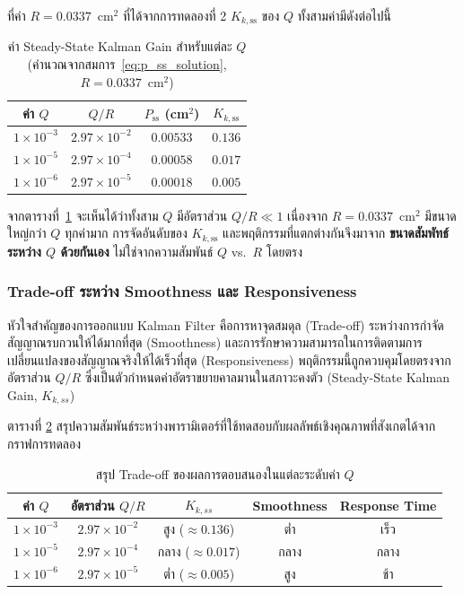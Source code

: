 ที่ค่า $R = 0.0337$~cm$^2$ ที่ได้จากการทดลองที่ 2
$K_{k,\mathrm{ss}}$ ของ $Q$ ทั้งสามค่ามีดังต่อไปนี้

\begin{table}[htbp]
    \centering
    \caption{ค่า Steady-State Kalman Gain สำหรับแต่ละ $Q$
             (คำนวณจากสมการ~\eqref{eq:p_ss_solution}, $R = 0.0337$~cm$^2$)}
    \label{tab:kss_theory}
    \begin{tabular}{cccc}
        \hline
        \textbf{ค่า $Q$} & \textbf{$Q/R$} & \textbf{$P_\mathrm{ss}$ (cm$^2$)} & \textbf{$K_{k,\mathrm{ss}}$} \\
        \hline
        $1\times10^{-3}$ & $2.97\times10^{-2}$ & $0.00533$ & $0.136$ \\
        $1\times10^{-5}$ & $2.97\times10^{-4}$ & $0.00058$ & $0.017$ \\
        $1\times10^{-6}$ & $2.97\times10^{-5}$ & $0.00018$ & $0.005$ \\
        \hline
    \end{tabular}
\end{table}

จากตารางที่~\ref{tab:kss_theory} จะเห็นได้ว่าทั้งสาม $Q$ มีอัตราส่วน $Q/R \ll 1$
เนื่องจาก $R = 0.0337$~cm$^2$ มีขนาดใหญ่กว่า $Q$ ทุกค่ามาก
การจัดอันดับของ $K_{k,\mathrm{ss}}$ และพฤติกรรมที่แตกต่างกันจึงมาจาก
\textbf{ขนาดสัมพัทธ์ระหว่าง $Q$ ด้วยกันเอง} ไม่ใช่จากความสัมพันธ์
$Q$ vs.\ $R$ โดยตรง

\subsubsection{Trade-off ระหว่าง Smoothness และ Responsiveness}

หัวใจสำคัญของการออกแบบ Kalman Filter คือการหาจุดสมดุล (Trade-off) ระหว่างการกำจัดสัญญาณรบกวนให้ได้มากที่สุด (Smoothness) และการรักษาความสามารถในการติดตามการเปลี่ยนแปลงของสัญญาณจริงให้ได้เร็วที่สุด (Responsiveness) พฤติกรรมนี้ถูกควบคุมโดยตรงจากอัตราส่วน $Q/R$ ซึ่งเป็นตัวกำหนดค่าอัตราขยายคาลมานในสภาวะคงตัว (Steady-State Kalman Gain, $K_{k,ss}$) 

ตารางที่ \ref{tab:q_tradeoff} สรุปความสัมพันธ์ระหว่างพารามิเตอร์ที่ใช้ทดสอบกับผลลัพธ์เชิงคุณภาพที่สังเกตได้จากกราฟการทดลอง

\begin{table}[htbp]
    \centering
    \caption{สรุป Trade-off ของผลการตอบสนองในแต่ละระดับค่า $Q$}
    \label{tab:q_tradeoff}
    \begin{tabular}{ccccc}
        \hline
        \textbf{ค่า $Q$} & \textbf{อัตราส่วน $Q/R$} & \textbf{$K_{k,ss}$} & \textbf{Smoothness} & \textbf{Response Time} \\
        \hline
        $1 \times 10^{-3}$ & $2.97 \times 10^{-2}$ & สูง ($\approx 0.136$) & ต่ำ  & เร็ว \\
        $1 \times 10^{-5}$ & $2.97 \times 10^{-4}$ & กลาง ($\approx 0.017$) & กลาง & กลาง \\
        $1 \times 10^{-6}$ & $2.97 \times 10^{-5}$ & ต่ำ ($\approx 0.005$)  & สูง  & ช้า \\
        \hline
    \end{tabular}
\end{table}



